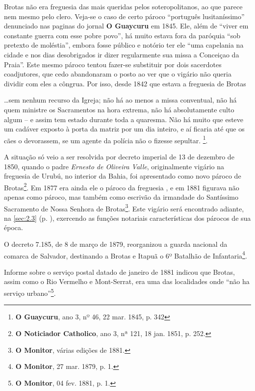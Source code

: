 Brotas não era freguesia das mais queridas pelos soteropolitanos, ao que parece nem mesmo pelo clero. Veja-se o caso de certo pároco ``português lusitaníssimo'' denunciado nas paginas do jornal \textbf{O Guaycuru} em 1845. Ele, além de ``viver em constante guerra com esse pobre povo'', há muito estava fora da paróquia ``sob pretexto de moléstia'', embora fosse público e notório ter ele ``uma capelania na cidade e nos dias desobrigados ir dizer regularmente sua missa a Conceiçao da Praia''. Este mesmo pároco tentou fazer-se substituir por dois sacerdotes coadjutores, que cedo abandonaram o posto ao ver que o vigário não queria dividir com eles a côngrua. Por isso, desde 1842 que estava a freguesia de Brotas 

\begin{citacao}
\dots sem nenhum recurso da Igreja; não há ao menos a missa conventual, não há quem ministre os Sacramentos na hora extrema, não há absolutamente culto algum -- e assim tem estado durante toda a quaresma. Não há muito que esteve um cadáver exposto à porta da matriz por um dia inteiro, e aí ficaria até que os cães o devorassem, se um agente da polícia não o fizesse sepultar. \footnote{\textbf{O Guaycuru}, ano 3, nº 46, 22 mar. 1845, p. 342}. 
\end{citacao}

A situação só veio a ser resolvida por decreto imperial de 13 de dezembro de 1850, quando o padre \textit{Ernesto de Oliveira Valle}, originalmente vigário na freguesia de Urubú, no interior da Bahia, foi apresentado como novo pároco de Brotas\footnote{\textbf{O Noticiador Catholico}, ano 3, nª 121, 18 jan. 1851, p. 252.}. Em 1877 era ainda ele o pároco da freguesia \cite[p.~176]{macosta_almana_1877}, e em 1881 figurava não apenas como pároco, mas também como escrivão da irmandade do Santíssimo Sacramento de Nossa Senhora de Brotas\footnote{\textbf{O Monitor}, várias edições de 1881.}. Este vigário será encontrado adiante, na \autoref{sec:2.3} (p. \pageref{sec:2.3}), exercendo as funções notariais características dos párocos de sua época.



O decreto 7.185, de 8 de março de 1879, reorganizou a guarda nacional da comarca de Salvador, destinando a Brotas e Itapuã o 6º Batalhão de Infantaria\footnote{\textbf{O Monitor}, 27 mar. 1879, p. 1.}.


Informe sobre o serviço postal datado de janeiro de 1881 indicou que Brotas, assim como o Rio Vermelho e Mont-Serrat, era uma das localidades onde ``não ha serviço urbano''\footnote{\textbf{O Monitor}, 04 fev. 1881, p. 1.}.